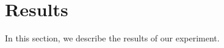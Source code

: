 \section{Results}\label{sec:results}
In this section, we describe the results of our experiment. 

% 
% 
